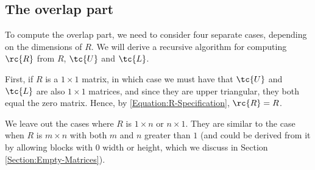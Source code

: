 \subsection{The overlap part}
\label{Section:Two-Step-Splitting}
To compute the overlap part, we need to consider four separate cases, depending on the dimensions of $R$. We will derive a recursive algorithm for computing $\rc{R}$ from $R$, $\tc{U}$ and $\tc{L}$. %

First, if $R$ is a $1 \times 1$ matrix, in which case we must have that $\tc{U}$ and $\tc{L}$ are also $1 \times 1$ matrices, and since they are upper triangular, they both equal the zero matrix. Hence, by \eqref{Equation:R-Specification}, $\rc{R} = R$.

We leave out the cases where $R$ is $1 \times n$ or $n \times 1$. They are similar to the case when $R$ is $m \times n$ with both $m$ and $n$ greater than $1$ (and could be derived from it by allowing blocks with $0$ width or height, which we discuss in Section \ref{Section:Empty-Matrices}).

